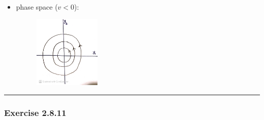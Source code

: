 \documentclass[12pt, letterpaper]{scrartcl}
\begin{document}
\begin{itemize}
\begin{align*}
\begin{array}{c}
            ic_1 
        \end{array}\right)
        +
        e^{-ivt}
        \left(\begin{array}{c}
            c_2 \\
            -ic_2 
        \end{array}\right)
        =
        \left(\begin{array}{c}
            \eta_1\cos vt +\eta_2 \sin vt\\
            -\eta_1\sin vt +\eta_2 \cos vt
        \end{array}\right)
    \end{align*}
    Using polar coordinates in which $y_1=r\cos\theta$ and $y_2=r\sin\theta$, by letting $\rho=\frac{1}{\sqrt{\eta_1^2+\eta_2^2}}$, $\cos \alpha=\frac{\eta_1}{\rho}$, $\sin \alpha=\frac{\eta_2}{\rho}$:

    \begin{align*}
        \phi(t)=\left(\begin{array}{c}
                \rho\cos(-(vt-\alpha))\\
                \rho\sin(-(vt-\alpha))
            \end{array}\right)
        \Longrightarrow
        r=\rho,\quad\theta=-(vt-\alpha)
    \end{align*}

    \item phase space ($v<0$):
    \begin{figure}[H]
    \centering
    \includegraphics[width=0.3\textwidth]{fig/2.8.10.JPG}
    \end{figure}
\end{itemize}
\vskip1mm\hrule


\subsubsection*{Exercise 2.8.11}
\end{document}
